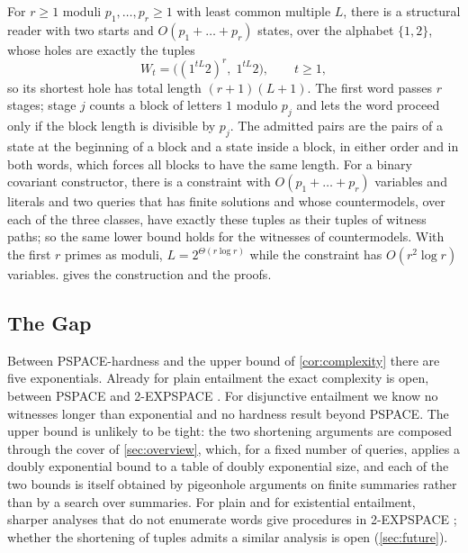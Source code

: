 \begin{example}
\label{ex:lcm}
For $r\ge1$ moduli $p_1,\dots,p_r\ge1$ with least common multiple $L$,
there is a
structural reader with two starts and $O(p_1+\dots+p_r)$ states, over the
alphabet $\{1,2\}$, whose holes are exactly the tuples
\[
  W_t=\bigl((1^{tL}2)^r,\;1^{tL}2\bigr),\qquad t\ge1,
\]
so its shortest hole has total length $(r+1)(L+1)$. The first word passes
$r$ stages; stage $j$ counts a block of letters $1$ modulo $p_j$ and lets
the word proceed only if the block length is divisible by $p_j$. The
admitted pairs are the pairs of a state at the beginning of a block and a
state inside a block, in either order and in both words, which forces all
blocks to have the same length. For a binary covariant constructor, there is
a constraint with $O(p_1+\dots+p_r)$ variables and literals and two queries
that has finite solutions and whose countermodels, over each of the three
classes, have exactly these tuples as their tuples of witness paths; so the
same lower bound holds for the witnesses of countermodels. With the first
$r$ primes as moduli, $L=2^{\Theta(r\log r)}$ while the constraint has
$O(r^2\log r)$ variables.  gives the construction
and the proofs.
\end{example}

\subsection{The Gap}\label{sec:complexity-gap}

Between PSPACE-hardness and the upper bound of \cref{cor:complexity} there
are five exponentials. Already for plain entailment the exact complexity is
open, between PSPACE and 2-EXPSPACE \cite{Zhao26}. For disjunctive
entailment we know no witnesses longer than exponential and no hardness
result beyond PSPACE. The upper bound is unlikely to be tight: the two
shortening arguments are composed through the cover of \cref{sec:overview},
which, for a fixed number of queries, applies a doubly exponential bound to
a table of doubly exponential size, and each of the two bounds is itself obtained by pigeonhole arguments
on finite summaries rather than by a search over summaries. For plain and
for existential entailment, sharper analyses that do not enumerate words give
procedures in 2-EXPSPACE \cite{Zhao26,Zhao26E}; whether the shortening of
tuples admits a similar analysis is open (\cref{sec:future}).
